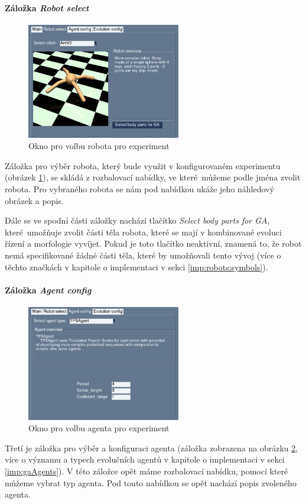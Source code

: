 \paragraph{Záložka \emph{Robot select}}
\begin{figure}[!htb]
    \centering
    \includegraphics[width=0.6\textwidth]{../img/GUI_robot_tab.jpg}
    \caption{Okno pro volbu robota pro experiment}
    \label{doc_12_fig:GUI_robot}
\end{figure}

Záložka pro výběr robota, který bude využit v konfigurovaném experimentu
(obrázek \ref{doc_12_fig:GUI_robot}), se skládá z rozbalovací nabídky, ve
které~můžeme podle jména zvolit robota. Pro vybraného robota se nám pod
nabídkou ukáže jeho náhledový obrázek a popis. 

Dále se ve spodní části záložky nachází tlačítko \emph{Select body parts for
GA}, které~umožňuje zvolit části těla robota, které se mají v kombinované
evoluci řízení a morfologie vyvíjet. Pokud je toto tlačítko neaktivní, znamená
to, že robot nemá specifikované žádné části těla, které by umožňovali tento
vývoj (více o těchto značkách v kapitole o implementaci v sekci
\ref{imp:robots:symbols}).

\paragraph{Záložka \emph{Agent config}}
\begin{figure}[!htb]
    \centering
    \includegraphics[width=0.6\textwidth]{../img/GUI_agent_tab.jpg}
    \caption{Okno pro volbu agenta pro experiment}
    \label{doc_12_fig:GUI_agent}
\end{figure}
Třetí je záložka pro výběr a konfiguraci agenta (záložka zobrazena na obrázku
\ref{doc_12_fig:GUI_agent}, více o významu a typech evolučních agentů v
kapitole o implementaci v sekci \ref{imp:gaAgents}). V této záložce opět máme
rozbalovací nabídku, pomocí které můžeme vybrat typ agenta. Pod touto nabídkou
se opět nachází popis zvoleného agenta. 

